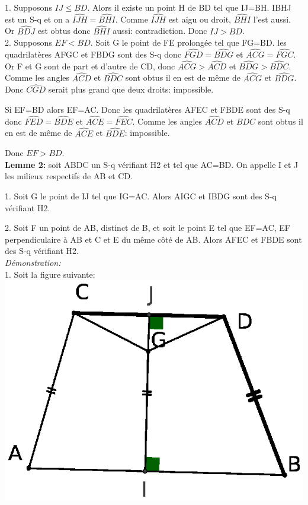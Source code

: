 \documentclass[a4paper, 12pt, twoside]{book}
\begin{document}
 1. Supposons $IJ\leq BD$. Alors il existe un point H de BD tel que IJ=BH. IBHJ est un S-q et on a $\hat{IJH}=\hat{BHI}$. Comme $\hat{IJH}$ est aigu ou droit, $\hat{BHI}$ l'est aussi. Or $\hat{BDJ}$ est obtus donc $\hat{BHI}$ aussi: contradiction. Donc $IJ>BD$.\\
 
 2. Supposons $EF<BD$. Soit G le point de FE prolongée tel que FG=BD. les quadrilatères AFGC et FBDG sont des S-q donc $\hat{FGD}=\hat{BDG}$ et $\hat{ACG}=\hat{FGC}$. Or F et G sont de part et d'autre de CD, donc  $\hat{ACG}>\hat{ACD}$ et $\hat{BDG}>\hat{BDC}$. Comme les angles $\hat{ACD}$ et $\hat{BDC}$ sont obtus il en est de même de $\hat{ACG}$ et $\hat{BDG}$. Donc $\hat{CGD}$ serait plus grand que deux droits:  impossible.\
 
 Si EF=BD alors EF=AC. Donc les quadrilatères AFEC et FBDE sont des S-q donc $\hat{FED}=\hat{BDE}$ et $\hat{ACE}=\hat{FEC}$. Comme les angles $\hat{ACD}$ et $\hat{BDC}$ sont obtus il en est de même de $\hat{ACE}$ et $\hat{BDE}$: impossible.\
 
 Donc $EF>BD$.\\
 
 
 \textbf{Lemme 2:} soit ABDC un S-q vérifiant H2 et tel que AC=BD. On appelle I et J  les milieux respectifs de AB et CD. \
 
 1. Soit G le point de IJ tel que IG=AC. Alors AIGC et IBDG sont des S-q vérifiant H2.\
 
 2. Soit F un point de AB, distinct de B, et soit le point E tel que EF=AC, EF perpendiculaire à AB et C et E du même côté de AB. Alors AFEC et FBDE sont des S-q vérifiant H2.\\
 
   \textit{Démonstration:}\\
   
 1. Soit la figure suivante:\\
 
  \includegraphics[scale=0.7]{figures/sacc137bis.eps}\\
 
\end{document}
